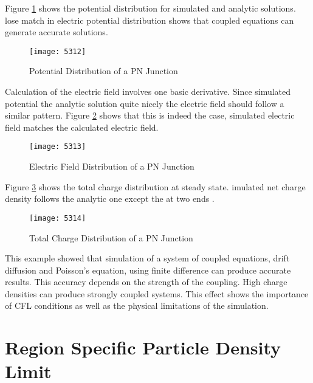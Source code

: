 \begin{doublespace}
 Figure \ref{pnpot} shows the potential distribution for simulated and analytic solutions. lose match in electric potential distribution shows that coupled equations can generate accurate solutions.
 
\begin{figure}[!htp]
\centering
\texttt{[image: 5312]}
\caption{Potential Distribution of a PN Junction} 
\label{pnpot}
\end{figure}

Calculation of the electric field involves one basic derivative. Since  simulated potential  the analytic solution quite nicely the electric field should follow a similar pattern. Figure \ref{pnefield} shows that this is indeed the case,  simulated electric field matches the calculated electric field.
\begin{figure}[!htp]
\centering
\texttt{[image: 5313]}
\caption{Electric Field Distribution of a PN Junction} 
\label{pnefield}
\end{figure}

Figure \ref{pncd} shows the total charge distribution at steady state. imulated net charge density follows the analytic one except  the  at  two ends . 
\begin{figure}
\centering
\texttt{[image: 5314]}
\caption{Total Charge Distribution of a PN Junction} 
\label{pncd}
\end{figure}

This example showed that simulation of a system of coupled equations, drift diffusion and Poisson's equation, using finite difference can produce accurate results. This accuracy depends on the strength of the coupling. High charge densities can produce strongly coupled systems. This effect shows the importance of CFL conditions as well as the physical limitations of the simulation.


\clearpage
\section{Region Specific Particle Density Limit}


\end{doublespace}
